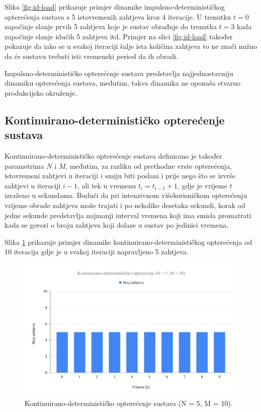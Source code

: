 \documentclass[times, utf8, diplomski]{fer}
\begin{document}
Slika \ref{fig:id-load} prikazuje primjer dinamike impulsno-determinističkog opterećenja sustava s 5 istovremenih zahtjeva kroz 4 iteracije. U trenutku $t=0$ započinje slanje prvih 5 zahtjeva koje je sustav obrađuje do trenutka $t=3$ kada započinje slanje idućih 5 zahtjeva itd. Primjer na slici \ref{fig:id-load} također pokazuje da iako se u svakoj iteraciji šalje ista količina zahtjeva to ne znači nužno da će sustavu trebati isti vremenski period da ih obradi.

Impulsno-determinističko opterećenje sustava predstavlja najjednostavniju dinamiku opterećenja sustava, međutim, takva dinamika ne oponaša stvarno produkcijsko okruženje.

\subsection{Kontinuirano-determinističko opterećenje sustava}
\label{subsec:cd-load}
Kontinuirano-determinističko opterećenje sustava definirano je također parametrima $N$ i $M$, međutim, za razliku od prethodne vrste opterećenja, istovremeni zahtjevi u iteraciji $i$ smiju biti poslani i prije nego što se izvrše zahtjevi u iteraciji $i-1$, ali tek u vremenu $t_i = t_{i - 1} + 1$, gdje je vrijeme $t$ izraženo u sekundama. Budući da pri intenzivnom višekorisničkom opterećenju vrijeme obrade zahtjeva može trajati i po nekoliko desetaka sekundi, korak od jedne sekunde predstavlja najmanji interval vremena koji ima smisla promatrati kada se govori o broju zahtjeva koji dolaze u sustav po jedinici vremena.

Slika \ref{fig:cd-load} prikazuje primjer dinamike kontinuirano-determinističkog opterećenja od 10 iteracija gdje je u svakoj iteraciji napravljeno 5 zahtjeva.

\begin{figure}[htb]
	\centering
	\includegraphics[width=\textwidth]{images/Kontinuirano-deterministicko opterecenje (N = 5, M = 10).pdf}
	\caption{
		Kontinuirano-determinističko opterećenje sustava (N = 5, M = 10).
	}
	\label{fig:cd-load}
\end{figure}
\end{document}
